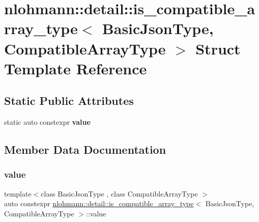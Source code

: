 \hypertarget{structnlohmann_1_1detail_1_1is__compatible__array__type}{}\section{nlohmann\+::detail\+::is\+\_\+compatible\+\_\+array\+\_\+type$<$ Basic\+Json\+Type, Compatible\+Array\+Type $>$ Struct Template Reference}
\label{structnlohmann_1_1detail_1_1is__compatible__array__type}
\subsection*{Static Public Attributes}
\begin{DoxyCompactItemize}
\item 
static auto constexpr {\bfseries value}
\end{DoxyCompactItemize}


\subsection{Member Data Documentation}
\mbox{\label{structnlohmann_1_1detail_1_1is__compatible__array__type_a01bc2274c22746bbb2cefd2acee8b572}} 
\subsubsection{\texorpdfstring{value}{value}}
{\footnotesize\ttfamily template$<$class Basic\+Json\+Type , class Compatible\+Array\+Type $>$ \\
auto constexpr \mbox{\hyperlink{structnlohmann_1_1detail_1_1is__compatible__array__type}{nlohmann\+::detail\+::is\+\_\+compatible\+\_\+array\+\_\+type}}$<$ Basic\+Json\+Type, Compatible\+Array\+Type $>$\+::value\hspace{0.3cm}{\ttfamily [static]}}

